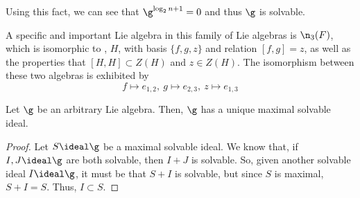 \documentclass[11pt,leqno,oneside]{amsart}
\numberwithin{thm}{section}
\begin{document}
\begin{example}
  Using this fact, we can see that \(\g^{\log_2 n + 1} = 0\) and thus
  \(\g\) is solvable.
\end{example}
\begin{example}
  A specific and important Lie algebra in this family of Lie algebras is
  \(\n_3(F)\), which is isomorphic to ,
  \(H\), with 
  basis \(\{f,g,z\}\) and relation \([f,g] = z\), as well as the properties
  that \([H,H] \subset Z(H)\) and \(z \in Z(H)\). The isomorphism
  between these two algebras is exhibited by \[
    f \mapsto e_{1,2}, \ g \mapsto e_{2,3}, \ z \mapsto e_{1,3}
  \]
\end{example}
\begin{prop}
  Let \(\g\) be an arbitrary Lie algebra. Then, \(\g\) has a unique
  maximal solvable ideal.
\end{prop}
\begin{proof}
  Let \(S \ideal \g\) be a maximal solvable ideal. We know that, if
  \(I,J \ideal \g\) are both solvable, then \(I+J\) is solvable. So,
  given another solvable ideal \(I \ideal \g\), it must be that
  \(S+I\) is solvable, but since \(S\) is maximal, \(S+I = S\). Thus,
  \(I \subset S\). 
\end{proof}
\end{document}
